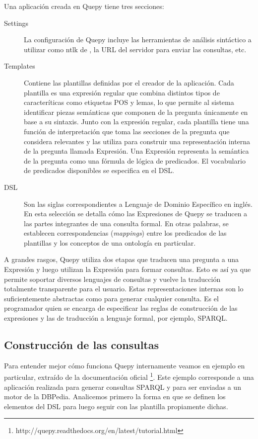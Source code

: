 Una aplicación creada en Quepy tiene tres secciones:
\begin{description}
    \item[Settings] La configuración de Quepy incluye las herramientas de análisis sintáctico a utilizar como ntlk de \citet{nltk}, la URL del servidor para enviar las consultas, etc.
    \item[Templates] Contiene las plantillas definidas por el creador de la aplicación. Cada plantilla es una expresión regular que combina distintos tipos de caracteríticas como etiquetas POS y lemas, lo que permite al sistema identificar piezas semánticas que componen de la pregunta únicamente en base a su sintaxis. Junto con la expresión regular, cada plantilla tiene una función de interpretación que toma las secciones de la pregunta que considera relevantes y las utiliza para construir una representación interna de la pregunta llamada Expresión. Una Expresión representa la semántica de la pregunta como una fórmula de lógica de predicados. El vocabulario de predicados disponibles se especifica en el DSL.
    \item[DSL] Son las siglas correspondientes a Lenguaje de Dominio Específico en inglés. En esta selección se detalla cómo las Expresiones de Quepy se traducen a las partes integrantes de una consulta formal. En otras palabras, se establecen correspondencias (\textit{mappings}) entre los predicados de las plantillas y los conceptos de una ontología en particular.
\end{description}

A grandes rasgos, Quepy utiliza dos etapas que traducen una pregunta a una Expresión y luego utilizan la Expresión para formar consultas. Esto es así ya que permite soportar diversos lenguajes de consultas y vuelve la traducción totalmente transparente para el usuario. Estas representaciones internas son lo suficientemente abstractas como para generar cualquier consulta. Es el programador quien se encarga de especificar las reglas de construcción de las expresiones y las de traducción a lenguaje formal, por ejemplo, SPARQL.

\subsection{Construcción de las consultas}

Para entender mejor cómo funciona Quepy internamente veamos en ejemplo en particular, extraído de la documentación oficial \footnote{http://quepy.readthedocs.org/en/latest/tutorial.html}. Este ejemplo corresponde a una aplicación realizada para generar consultas SPARQL y para ser enviadas a un motor de la DBPedia. Analicemos primero la forma en que se definen los elementos del DSL para luego seguir con las plantilla propiamente dichas.

